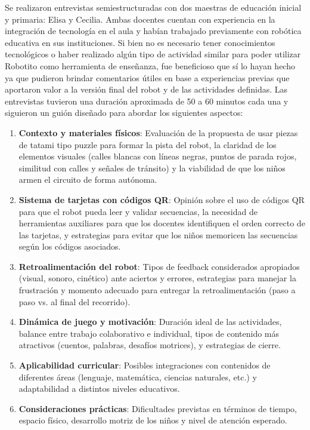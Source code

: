 \documentclass{prgrado}
\begin{document}
Se realizaron entrevistas semiestructuradas con dos maestras de educación inicial y primaria: Elisa y Cecilia. Ambas docentes cuentan con experiencia en la integración de tecnología en el aula y habían trabajado previamente con robótica educativa en sus instituciones. Si bien no es necesario tener conocimientos tecnológicos o haber realizado algún tipo de actividad similar para poder utilizar Robotito como herramienta de enseñanza, fue beneficioso que sí lo hayan hecho ya que pudieron brindar comentarios útiles en base a experiencias previas que aportaron valor a la versión final del robot y de las actividades definidas.
Las entrevistas tuvieron una duración aproximada de 50 a 60 minutos cada una y siguieron un guión diseñado para abordar los siguientes aspectos:

\begin{enumerate}
\item \textbf{Contexto y materiales físicos}: Evaluación de la propuesta de usar piezas de tatami tipo puzzle para formar la pista del robot, la claridad de los elementos visuales (calles blancas con líneas negras, puntos de parada rojos, similitud con calles y señales de tránsito) y la viabilidad de que los niños armen el circuito de forma autónoma.
\item \textbf{Sistema de tarjetas con códigos QR}: Opinión sobre el uso de códigos QR para que el robot pueda leer y validar secuencias, la necesidad de herramientas auxiliares para que los docentes identifiquen el orden correcto de las tarjetas, y estrategias para evitar que los niños memoricen las secuencias según los códigos asociados.
\item \textbf{Retroalimentación del robot}: Tipos de feedback considerados apropiados (visual, sonoro, cinético) ante aciertos y errores, estrategias para manejar la frustración y momento adecuado para entregar la retroalimentación (paso a paso vs. al final del recorrido).
\item \textbf{Dinámica de juego y motivación}: Duración ideal de las actividades, balance entre trabajo colaborativo e individual, tipos de contenido más atractivos (cuentos, palabras, desafíos motrices), y estrategias de cierre.
\item \textbf{Aplicabilidad curricular}: Posibles integraciones con contenidos de diferentes áreas (lenguaje, matemática, ciencias naturales, etc.) y adaptabilidad a distintos niveles educativos.
\item \textbf{Consideraciones prácticas}: Dificultades previstas en términos de tiempo, espacio físico, desarrollo motriz de los niños y nivel de atención esperado.
\end{enumerate}
\end{document}
